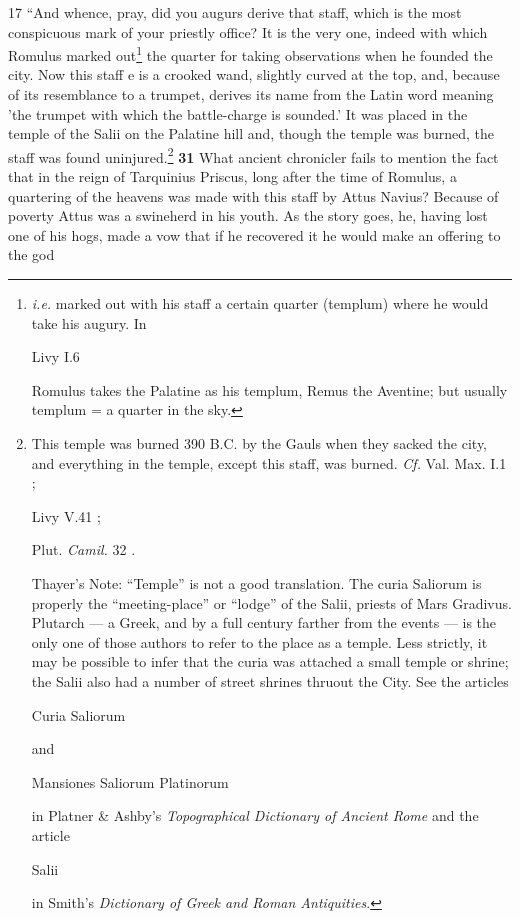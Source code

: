 17
``And whence, pray, did you augurs derive that staff, which is the most conspicuous mark of your priestly office? It is the very one, indeed with which Romulus marked out\texthebrew{}\footnote{\emph{i.e.} marked out with his staff a certain quarter (templum) where he would take his augury. In

Livy I.6

Romulus takes the Palatine as his templum, Remus the Aventine; but usually templum = a quarter in the sky.

} the quarter for taking observations when he founded the city. Now this staff\texthebrew{} e is a crooked wand, slightly curved at the top, and, because of its resemblance to a trumpet, derives its name from the Latin word meaning 'the trumpet with which the battle-charge is sounded.' It was placed in the temple of the Salii on the Palatine hill and, though the temple was burned, the staff was found uninjured.\texthebrew{}\footnote{This temple was burned 390 B.C. by the Gauls when they sacked the city, and everything in the temple, except this staff, was burned. \emph{Cf.}
Val. Max. I.1 ;

Livy V.41 ;

Plut. \emph{Camil.} 32 .

Thayer's Note: ``Temple'' is not a good translation. The curia Saliorum is properly the ``meeting-place'' or ``lodge'' of the Salii, priests of Mars Gradivus. Plutarch \texthebrew{—} a Greek, and by a full century farther from the events \texthebrew{—} is the only one of those authors to refer to the place as a temple. Less strictly, it may be possible to infer that the curia was attached a small temple or shrine; the Salii also had a number of street shrines thruout the City. See the articles

Curia Saliorum

and

Mansiones Saliorum Platinorum

in Platner \& Ashby's \emph{Topographical Dictionary of Ancient Rome} and the article

Salii

in Smith's \emph{Dictionary of Greek and Roman Antiquities}.

} \textbf{31} What ancient chronicler fails to mention the fact that in the reign of Tarquinius Priscus, long after the time of Romulus, a quartering of the heavens was made with this staff by Attus Navius? Because of poverty Attus was a swineherd in his youth. As the story goes, he, having lost one of his hogs, made a vow that if he recovered it he would make an offering to the god

